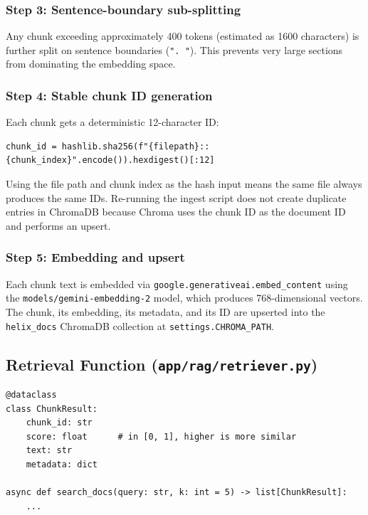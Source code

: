 \documentclass[12pt,a4paper]{article}
\begin{document}
\subsubsection{Step 3: Sentence-boundary sub-splitting}

Any chunk exceeding approximately 400 tokens (estimated as 1600 characters) is further split on sentence boundaries (\texttt{". "}). This prevents very large sections from dominating the embedding space.

\subsubsection{Step 4: Stable chunk ID generation}

Each chunk gets a deterministic 12-character ID:

\begin{lstlisting}[style=python, numbers=none]
chunk_id = hashlib.sha256(f"{filepath}::{chunk_index}".encode()).hexdigest()[:12]
\end{lstlisting}

Using the file path and chunk index as the hash input means the same file always produces the same IDs. Re-running the ingest script does not create duplicate entries in ChromaDB because Chroma uses the chunk ID as the document ID and performs an upsert.

\subsubsection{Step 5: Embedding and upsert}

Each chunk text is embedded via \texttt{google.generativeai.embed\_content} using the \texttt{models/gemini-embedding-2} model, which produces 768-dimensional vectors. The chunk, its embedding, its metadata, and its ID are upserted into the \texttt{helix\_docs} ChromaDB collection at \texttt{settings.CHROMA\_PATH}.

\subsection{Retrieval Function (\texttt{app/rag/retriever.py})}

\begin{lstlisting}[style=python]
@dataclass
class ChunkResult:
    chunk_id: str
    score: float      # in [0, 1], higher is more similar
    text: str
    metadata: dict

async def search_docs(query: str, k: int = 5) -> list[ChunkResult]:
    ...
\end{lstlisting}
\end{document}
